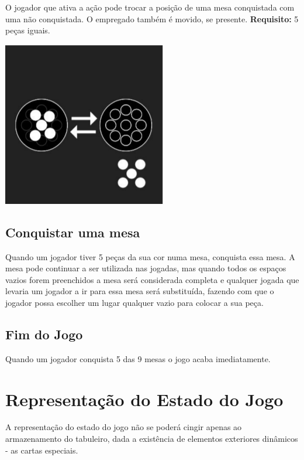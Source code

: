 \documentclass[a4paper]{article}
\begin{document}
\begin{itemize}
\begin{minipage}{0.58\textwidth}
\item O jogador que ativa a ação pode trocar a posição de uma mesa conquistada com uma não conquistada. O empregado também é movido, se presente. \newline 
\textbf{Requisito:} 5 peças iguais.
\end{minipage}
\hspace{4mm}
\begin{minipage}{0.58\textwidth}
\includegraphics[scale=0.2]{swap-claimed.png}
\end{minipage}

\end{itemize}

\subsection{Conquistar uma mesa}
Quando um jogador tiver 5 peças da sua cor numa mesa, conquista essa mesa. A mesa pode continuar a ser utilizada nas jogadas, mas quando todos os espaços vazios forem preenchidos a mesa será considerada completa e qualquer jogada que levaria um jogador a ir para essa mesa será substituída, fazendo com que o jogador possa escolher um lugar qualquer vazio para colocar a sua peça.

\subsection{Fim do Jogo}
Quando um jogador conquista 5 das 9 mesas o jogo acaba imediatamente.

\newpage
\section{Representação do Estado do Jogo}
A representação do estado do jogo não se poderá cingir apenas ao armazenamento do tabuleiro, dada a existência de elementos exteriores dinâmicos - as cartas especiais.
\end{document}
